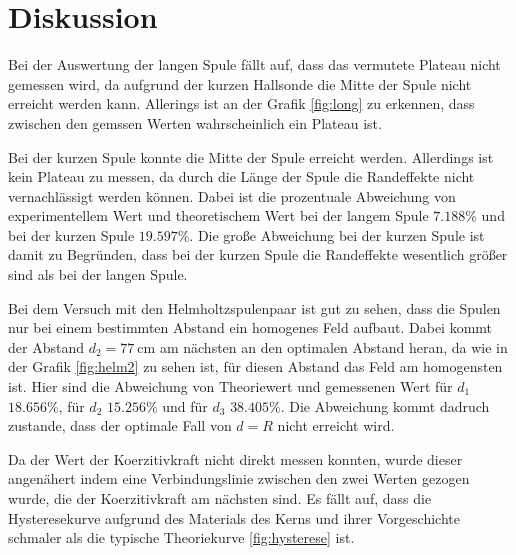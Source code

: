 \section{Diskussion}
\label{sec:Diskussion}

Bei der Auswertung der langen Spule fällt auf, dass das vermutete Plateau nicht gemessen wird, da aufgrund der kurzen Hallsonde die Mitte der Spule nicht erreicht werden kann.
Allerings ist an der Grafik \ref{fig:long} zu erkennen, dass zwischen den gemssen Werten wahrscheinlich ein Plateau ist.

Bei der kurzen Spule konnte die Mitte der Spule erreicht werden. 
Allerdings ist kein Plateau zu messen, da durch die Länge der Spule die Randeffekte nicht vernachlässigt werden können.
Dabei ist die prozentuale Abweichung von experimentellem Wert und theoretischem Wert bei der langem Spule $7.188\%$ und bei der kurzen Spule $19.597\%$.
Die große Abweichung bei der kurzen Spule ist damit zu Begründen, dass bei der kurzen Spule die Randeffekte wesentlich größer sind als bei der langen Spule.

Bei dem Versuch mit den Helmholtzspulenpaar ist gut zu sehen, dass die Spulen nur bei einem bestimmten Abstand ein homogenes Feld aufbaut.
Dabei kommt der Abstand $d_2=7\SI{7}{\centi\meter}$ am nächsten an den optimalen Abstand heran, da wie in der Grafik \ref{fig:helm2} zu sehen ist, für diesen Abstand das Feld am homogensten ist.
Hier sind die Abweichung von Theoriewert und gemessenen Wert für $d_1$ $18.656\%$, für $d_2$ $15.256 \%$ und für $d_3$ $38.405 \%$.
Die Abweichung kommt dadruch zustande, dass der optimale Fall von $d=R$ nicht erreicht wird.

Da der Wert der Koerzitivkraft nicht direkt messen konnten, wurde dieser angenähert indem eine Verbindungslinie zwischen den zwei Werten gezogen wurde, die der Koerzitivkraft am nächsten sind.
Es fällt auf, dass die Hysteresekurve aufgrund des Materials des Kerns und ihrer Vorgeschichte schmaler als die typische Theoriekurve \ref{fig:hysterese} ist.